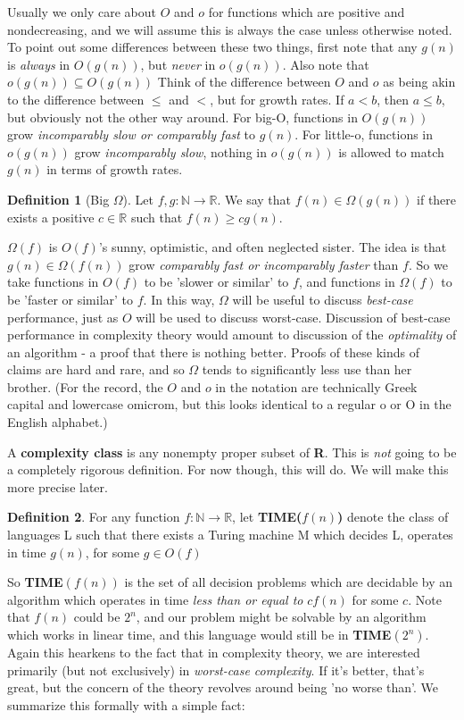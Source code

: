 \documentclass{article}
\theoremstyle{definition}
\newtheorem{definition}{Definition}[section]
\theoremstyle{plain}
\theoremstyle{theorem}
\begin{document}
Usually we only care about $O$ and $o$ for functions which are positive and nondecreasing, and we will assume this is always the case unless otherwise noted. To point out some differences between these two things, first note that any $g(n)$ is \textit{always} in $O(g(n))$, but \textit{never} in $o(g(n))$. Also note that $o(g(n)) \subseteq O(g(n))$ Think of the difference between $O$ and $o$ as being akin to the difference between $\leq$ and $<$, but for growth rates. If $a < b$, then $a \leq b$, but obviously not the other way around. For big-O, functions in $O(g(n))$ grow \textit{incomparably slow or comparably fast} to $g(n)$. For little-o, functions in $o(g(n))$ grow \textit{incomparably slow}, nothing in $o(g(n))$ is allowed to match $g(n)$ in terms of growth rates.
\begin{definition}[Big $\Omega$]
	Let $f,g: \mathbb{N} \to \mathbb{R}$. We say that $f(n) \in \Omega(g(n))$ if there exists a positive $c \in \mathbb{R}$ such that $f(n) \geq cg(n)$.  
\end{definition} 
$\Omega(f)$ is $O(f)$'s sunny, optimistic, and often neglected sister. The idea is that $g(n) \in \Omega(f(n))$ grow \textit{comparably fast or incomparably faster} than $f$. So we take functions in $O(f)$ to be 'slower or similar' to $f$, and functions in $\Omega(f)$ to be 'faster or similar' to $f$. In this way, $\Omega$ will be useful to discuss \textit{best-case} performance, just as $O$ will be used to discuss worst-case. Discussion of best-case performance in complexity theory would amount to discussion of the \textit{optimality} of an algorithm - a proof that there is nothing better. Proofs of these kinds of claims are hard and rare, and so $\Omega$ tends to significantly less use than her brother. (For the record, the $O$ and $o$ in the notation are technically Greek capital and lowercase omicrom, but this looks identical to a regular o or O in the English alphabet.)
\par A \textbf{complexity class} is any nonempty proper subset of \textbf{R}. This is \textit{not} going to be a completely rigorous definition. For now though, this will do. We will make this more precise later.
\begin{definition}
	 For any function $f:\mathbb{N} \to \mathbb{R}$, let \textbf{TIME($f(n)$)} denote the class of languages L such that there exists a Turing machine M which decides L, operates in time $g(n)$, for some $g \in O(f)$
\end{definition}
So \textbf{TIME}$(f(n))$ is the set of all decision problems which are decidable by an algorithm which operates in time \textit{less than or equal to} $cf(n)$ for some $c$. Note that $f(n)$ could be $2^n$, and our problem might be solvable by an algorithm which works in linear time, and this language would still be in \textbf{TIME}$(2^n)$. Again this hearkens to the fact that in complexity theory, we are interested primarily (but not exclusively) in \textit{worst-case complexity}. If it's better, that's great, but the concern of the theory revolves around being 'no worse than'. We summarize this formally with a simple fact:
\end{document}
